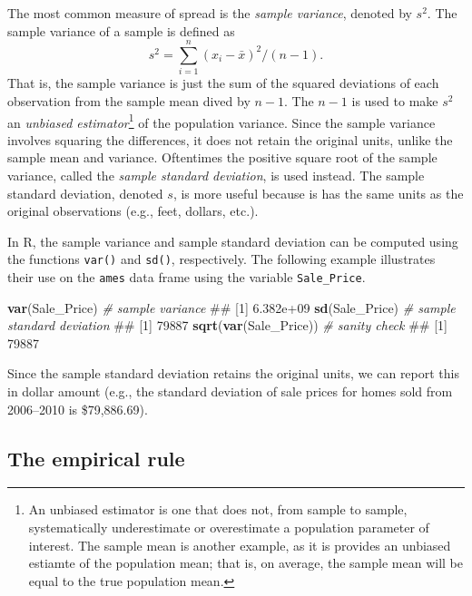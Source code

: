 \documentclass[]{book}
\newenvironment{Shaded}{\begin{snugshade}}{\end{snugshade}}
\newcommand{\CommentTok}[1]{\textcolor[rgb]{0.56,0.35,0.01}{\textit{#1}}}
\newcommand{\KeywordTok}[1]{\textcolor[rgb]{0.13,0.29,0.53}{\textbf{#1}}}
\newcommand{\NormalTok}[1]{#1}
\let\rmarkdownfootnote\footnote%
\def\footnote{\protect\rmarkdownfootnote}
\theoremstyle{definition}
\theoremstyle{definition}
\theoremstyle{definition}
\theoremstyle{remark}
\begin{document}
The most common measure of spread is the \emph{sample variance}, denoted
by \(s^2\). The sample variance of a sample is defined as
\begin{equation*}
  s ^ 2 = \sum_{i = 1} ^ n \left(x_i - \bar{x}\right) ^ 2 / \left(n - 1\right).
\end{equation*} That is, the sample variance is just the sum of the
squared deviations of each observation from the sample mean dived by
\(n - 1\). The \(n - 1\) is used to make \(s ^ 2\) an \emph{unbiased
estimator}\footnote{An unbiased estimator is one that does not, from
  sample to sample, systematically underestimate or overestimate a
  population parameter of interest. The sample mean is another example,
  as it is provides an unbiased estiamte of the population mean; that
  is, on average, the sample mean will be equal to the true population
  mean.} of the population variance. Since the sample variance involves
squaring the differences, it does not retain the original units, unlike
the sample mean and variance. Oftentimes the positive square root of the
sample variance, called the \emph{sample standard deviation}, is used
instead. The sample standard deviation, denoted \(s\), is more useful
because is has the same units as the original observations (e.g., feet,
dollars, etc.).

In R, the sample variance and sample standard deviation can be computed
using the functions \texttt{var()} and \texttt{sd()}, respectively. The
following example illustrates their use on the \texttt{ames} data frame
using the variable \texttt{Sale\_Price}.

\begin{Shaded}
\begin{Highlighting}[]
\KeywordTok{var}\NormalTok{(Sale_Price)  }\CommentTok{# sample variance}
\NormalTok{## [1] 6.382e+09}
\KeywordTok{sd}\NormalTok{(Sale_Price)  }\CommentTok{# sample standard deviation}
\NormalTok{## [1] 79887}
\KeywordTok{sqrt}\NormalTok{(}\KeywordTok{var}\NormalTok{(Sale_Price))  }\CommentTok{# sanity check}
\NormalTok{## [1] 79887}
\end{Highlighting}
\end{Shaded}

Since the sample standard deviation retains the original units, we can
report this in dollar amount (e.g., the standard deviation of sale
prices for homes sold from 2006--2010 is \$79,886.69).

\hypertarget{empirical-rule}{%
\subsection{The empirical rule}\label{empirical-rule}}
\end{document}
